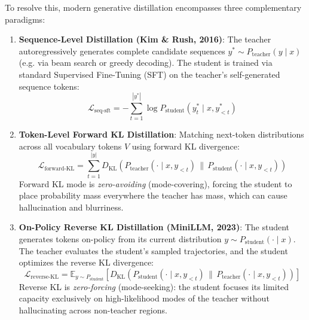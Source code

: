 \documentclass[11pt,a4paper]{article}
\theoremstyle{definition}
\begin{document}
To resolve this, modern generative distillation encompasses three complementary paradigms:
\begin{enumerate}
    \item \textbf{Sequence-Level Distillation (Kim \& Rush, 2016)}:
    The teacher autoregressively generates complete candidate sequences $y^* \sim P_{\text{teacher}}(y \mid x)$ (e.g. via beam search or greedy decoding). The student is trained via standard Supervised Fine-Tuning (SFT) on the teacher's self-generated sequence tokens:
    {\boldmath
    \begin{equation}
    \mathcal{L}_{\text{seq-sft}} = - \sum_{t=1}^{|y^*|} \log P_{\text{student}}(y_t^* \mid x, y_{<t}^*)
    \end{equation}
    }
    \item \textbf{Token-Level Forward KL Distillation}:
    Matching next-token distributions across all vocabulary tokens $V$ using forward KL divergence:
    {\boldmath
    \begin{equation}
    \mathcal{L}_{\text{forward-KL}} = \sum_{t=1}^{|y|} D_{\text{KL}}\left( P_{\text{teacher}}(\cdot \mid x, y_{<t}) \,\|\, P_{\text{student}}(\cdot \mid x, y_{<t}) \right)
    \end{equation}
    }
    Forward KL mode is \emph{zero-avoiding} (mode-covering), forcing the student to place probability mass everywhere the teacher has mass, which can cause hallucination and blurriness.
    \item \textbf{On-Policy Reverse KL Distillation (MiniLLM, 2023)}:
    The student generates tokens on-policy from its current distribution $y \sim P_{\text{student}}(\cdot \mid x)$. The teacher evaluates the student's sampled trajectories, and the student optimizes the reverse KL divergence:
    {\boldmath
    \begin{equation}
    \mathcal{L}_{\text{reverse-KL}} = \mathbb{E}_{y \sim P_{\text{student}}} \left[ D_{\text{KL}}\left( P_{\text{student}}(\cdot \mid x, y_{<t}) \,\|\, P_{\text{teacher}}(\cdot \mid x, y_{<t}) \right) \right]
    \end{equation}
    }
    Reverse KL is \emph{zero-forcing} (mode-seeking): the student focuses its limited capacity exclusively on high-likelihood modes of the teacher without hallucinating across non-teacher regions.
\end{enumerate}
\end{document}

